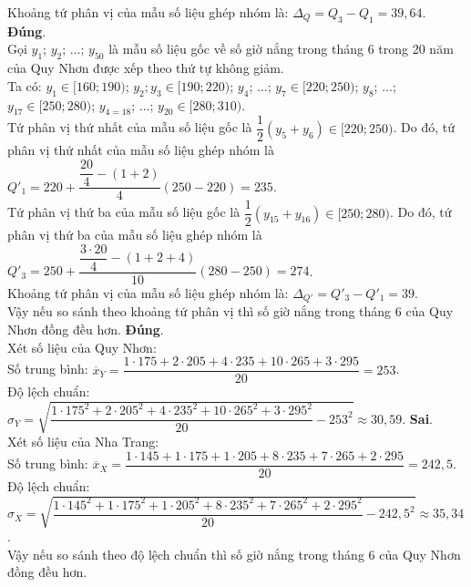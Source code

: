 \begin{ex}
{\begin{itemchoice}
			Khoảng tứ phân vị của mẫu số liệu ghép nhóm là: $\Delta_Q=Q_3-Q_1=39{,}64$.
			\itemch \textbf{Đúng}.\\
			Gọi $y_1$; $y_2$; $\ldots$; $y_{50}$ là mẫu số liệu gốc về số giờ nắng trong tháng 6 trong 20 năm của Quy Nhơn được xếp theo thứ tự không giảm.\\
			Ta có: $y_1\in [160;190)$; $y_2;y_3\in [190;220)$; $y_4$; $\ldots$; $y_7\in [220;250)$; $y_8$; $\ldots$; $y_{17}\in [250;280)$; $y_{4=18}$; $\ldots$; $y_{20}\in [280;310)$.\\
			Tứ phân vị thứ nhất của mẫu số liệu gốc là $\dfrac{1}{2}\left(y_5+y_6\right)\in[220;250)$. Do đó, tứ phân vị thứ nhất của mẫu số liệu ghép nhóm là $Q'_1=220+\dfrac{\dfrac{20}{4}-(1+2)}{4}(250-220)=235$.\\
			Tứ phân vị thứ ba của mẫu số liệu gốc là $\dfrac{1}{2}\left(y_{15}+y_{16}\right)\in[250;280)$. Do đó, tứ phân vị thứ ba của mẫu số liệu ghép nhóm là $Q'_3=250+\dfrac{\dfrac{3\cdot 20}{4}-(1+2+4)}{10}(280-250)=274$.\\
			Khoảng tứ phân vị của mẫu số liệu ghép nhóm là: $\Delta_{Q'}=Q'_3-Q'_1=39$.\\
			Vậy nếu so sánh theo khoảng tứ phân vị thì số giờ nắng trong tháng 6 của Quy Nhơn đồng đều hơn.
			\itemch \textbf{Đúng}.\\
			Xét số liệu của Quy Nhơn:\\
			Số trung bình: $\overline {x}_Y=\dfrac{1\cdot 175+2\cdot 205+4\cdot 235+10\cdot 265+3\cdot 295}{20}=253$.\\
			Độ lệch chuẩn: $\sigma_Y=\sqrt{\dfrac{1\cdot 175^2+2\cdot 205^2+4\cdot 235^2+10\cdot 265^2+3\cdot 295^2}{20}-253^2}\approx 30{,}59$.
			\itemch \textbf{Sai}.\\
			Xét số liệu của Nha Trang:\\
			Số trung bình: $\overline{x}_X=\dfrac{1\cdot 145+1\cdot 175+1\cdot 205+8\cdot 235+7\cdot 265+2\cdot 295}{20}=242{,}5$.\\
			Độ lệch chuẩn: $\sigma_X=\sqrt{\dfrac{1\cdot 145^2+1\cdot 175^2+1\cdot 205^2+8\cdot 235^2+7\cdot 265^2+2\cdot 295^2}{20}-242{,}5^2}\approx 35{,}34$.\\
			Vậy nếu so sánh theo độ lệch chuẩn thì số giờ nắng trong tháng $6$ của Quy Nhơn đồng đều hơn.
		\end{itemchoice}
			}
\end{ex}

